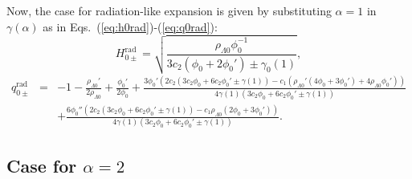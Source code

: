 \documentclass[onecolumn,superscriptaddress,secnumarabic,amssymb,amsmath,nobibnotes,aps,prd,nofootinbib,altaffilletter]{revtex4}
\begin{document}
Now, the case for radiation-like expansion is given by substituting $\alpha=1$ in $\gamma(\alpha)$ as in Eqs.~(\ref{eq:h0rad})-(\ref{eq:q0rad}):
\begin{equation}
    H_{0 \pm}^{\text{rad}}=\sqrt{\frac{\rho_{\Lambda 0 }\phi_0^{-1}}{3c_2(\phi_0 + 2\phi_0') \pm \gamma_0(1)}},
    \label{eq:h0radalfa1}
\end{equation}
\begin{eqnarray}
    q_{0\pm}^{\text{rad}}&=&-1-\frac{\rho_{\Lambda 0}'}{2\rho_{\Lambda 0}} + \frac{\phi_0'}{2\phi_0} + \frac{3\phi_0'\left(2c_2(3c_2\phi_0 + 6c_2\phi_0' \pm \gamma(1)) - c_1(\rho_{\Lambda 0}'(4\phi_0 + 3\phi_0') + 4\rho_{\Lambda 0}\phi_0')\right)}{4\gamma(1)\left(3c_2\phi_0 + 6c_2\phi_0' \pm \gamma(1)\right)} \nonumber \\
  &&  + \frac{6\phi_0''\left(2c_2(3c_2\phi_0 + 6c_2\phi_0' \pm \gamma(1))-c_1\rho_{\Lambda 0}(2\phi_0+3\phi_0') \right)}{4\gamma(1)\left(3c_2\phi_0 + 6c_2\phi_0' \pm \gamma(1)\right)}
    \label{eq:q0radalfa1}.
\end{eqnarray}



\subsection{Case for $\alpha=2$}
\end{document}
